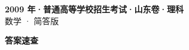 \documentclass[zihao=-4, a4paper]{ctexart}
\begin{document}
\begin{center}
  {\Large\bfseries 2009 年·普通高等学校招生考试·山东卷·理科}\\[4pt]
  {\large 数学 · 简答版}
\end{center}
\medskip
{}

\clearpage
{}
\begin{center}{\Large\bfseries 答案速查}\end{center}
\medskip

\end{document}
